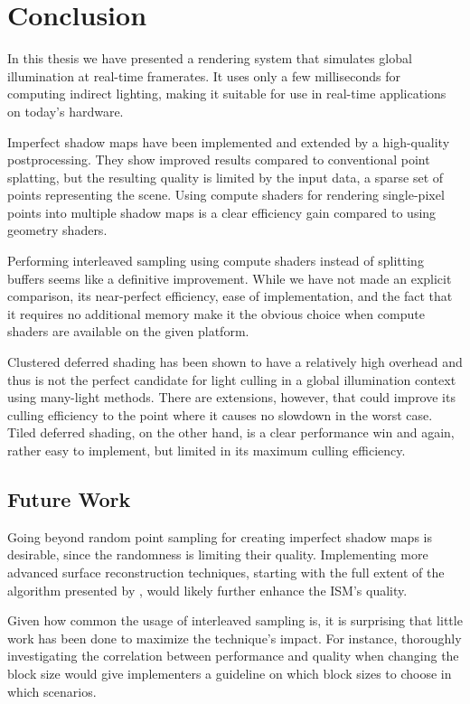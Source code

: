 

\chapter{Conclusion}
\label{chap:conclusion}

In this thesis we have presented a rendering system that simulates global illumination at real-time framerates. It uses only a few milliseconds for computing indirect lighting, making it suitable for use in real-time applications on today's hardware.

Imperfect shadow maps have been implemented and extended by a high-quality postprocessing. They show improved results compared to conventional point splatting, but the resulting quality is limited by the input data, a sparse set of points representing the scene. Using compute shaders for rendering single-pixel points into multiple shadow maps is a clear efficiency gain compared to using geometry shaders.

Performing interleaved sampling using compute shaders instead of splitting buffers seems like a definitive improvement. While we have not made an explicit comparison, its near-perfect efficiency, ease of implementation, and the fact that it requires no additional memory make it the obvious choice when compute shaders are available on the given platform.

Clustered deferred shading has been shown to have a relatively high overhead and thus is not the perfect candidate for light culling in a global illumination context using many-light methods. There are extensions, however, that could improve its culling efficiency to the point where it causes no slowdown in the worst case. Tiled deferred shading, on the other hand, is a clear performance win and again, rather easy to implement, but limited in its maximum culling efficiency.

\section{Future Work}

Going beyond random point sampling for creating imperfect shadow maps is desirable, since the randomness is limiting their quality. Implementing more advanced surface reconstruction techniques, starting with the full extent of the algorithm presented by \citet{Marroquim:2007:reconstruction}, would likely further enhance the ISM's quality.

Given how common the usage of interleaved sampling is, it is surprising that little work has been done to maximize the technique's impact. For instance, thoroughly investigating the correlation between performance and quality when changing the block size would give implementers a guideline on which block sizes to choose in which scenarios.

